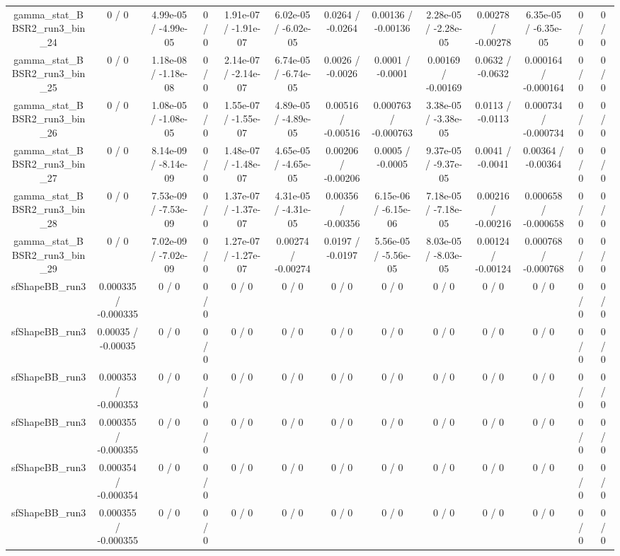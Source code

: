 \documentclass[10pt]{article}
\begin{document}
\begin{table}[htbp]
\begin{center}
\begin{tabular}{|c|c|c|c|c|c|c|c|c|c|c|c|c|}
  gamma_stat_BBSR2_run3_bin_24 & 0 / 0 & 4.99e-05 / -4.99e-05 & 0 / 0 & 1.91e-07 / -1.91e-07 & 6.02e-05 / -6.02e-05 & 0.0264 / -0.0264 & 0.00136 / -0.00136 & 2.28e-05 / -2.28e-05 & 0.00278 / -0.00278 & 6.35e-05 / -6.35e-05 & 0 / 0 & 0 / 0 \\ 
  gamma_stat_BBSR2_run3_bin_25 & 0 / 0 & 1.18e-08 / -1.18e-08 & 0 / 0 & 2.14e-07 / -2.14e-07 & 6.74e-05 / -6.74e-05 & 0.0026 / -0.0026 & 0.0001 / -0.0001 & 0.00169 / -0.00169 & 0.0632 / -0.0632 & 0.000164 / -0.000164 & 0 / 0 & 0 / 0 \\ 
  gamma_stat_BBSR2_run3_bin_26 & 0 / 0 & 1.08e-05 / -1.08e-05 & 0 / 0 & 1.55e-07 / -1.55e-07 & 4.89e-05 / -4.89e-05 & 0.00516 / -0.00516 & 0.000763 / -0.000763 & 3.38e-05 / -3.38e-05 & 0.0113 / -0.0113 & 0.000734 / -0.000734 & 0 / 0 & 0 / 0 \\ 
  gamma_stat_BBSR2_run3_bin_27 & 0 / 0 & 8.14e-09 / -8.14e-09 & 0 / 0 & 1.48e-07 / -1.48e-07 & 4.65e-05 / -4.65e-05 & 0.00206 / -0.00206 & 0.0005 / -0.0005 & 9.37e-05 / -9.37e-05 & 0.0041 / -0.0041 & 0.00364 / -0.00364 & 0 / 0 & 0 / 0 \\ 
  gamma_stat_BBSR2_run3_bin_28 & 0 / 0 & 7.53e-09 / -7.53e-09 & 0 / 0 & 1.37e-07 / -1.37e-07 & 4.31e-05 / -4.31e-05 & 0.00356 / -0.00356 & 6.15e-06 / -6.15e-06 & 7.18e-05 / -7.18e-05 & 0.00216 / -0.00216 & 0.000658 / -0.000658 & 0 / 0 & 0 / 0 \\ 
  gamma_stat_BBSR2_run3_bin_29 & 0 / 0 & 7.02e-09 / -7.02e-09 & 0 / 0 & 1.27e-07 / -1.27e-07 & 0.00274 / -0.00274 & 0.0197 / -0.0197 & 5.56e-05 / -5.56e-05 & 8.03e-05 / -8.03e-05 & 0.00124 / -0.00124 & 0.000768 / -0.000768 & 0 / 0 & 0 / 0 \\ 
  sfShapeBB_run3 & 0.000335 / -0.000335 & 0 / 0 & 0 / 0 & 0 / 0 & 0 / 0 & 0 / 0 & 0 / 0 & 0 / 0 & 0 / 0 & 0 / 0 & 0 / 0 & 0 / 0 \\ 
  sfShapeBB_run3 & 0.00035 / -0.00035 & 0 / 0 & 0 / 0 & 0 / 0 & 0 / 0 & 0 / 0 & 0 / 0 & 0 / 0 & 0 / 0 & 0 / 0 & 0 / 0 & 0 / 0 \\ 
  sfShapeBB_run3 & 0.000353 / -0.000353 & 0 / 0 & 0 / 0 & 0 / 0 & 0 / 0 & 0 / 0 & 0 / 0 & 0 / 0 & 0 / 0 & 0 / 0 & 0 / 0 & 0 / 0 \\ 
  sfShapeBB_run3 & 0.000355 / -0.000355 & 0 / 0 & 0 / 0 & 0 / 0 & 0 / 0 & 0 / 0 & 0 / 0 & 0 / 0 & 0 / 0 & 0 / 0 & 0 / 0 & 0 / 0 \\ 
  sfShapeBB_run3 & 0.000354 / -0.000354 & 0 / 0 & 0 / 0 & 0 / 0 & 0 / 0 & 0 / 0 & 0 / 0 & 0 / 0 & 0 / 0 & 0 / 0 & 0 / 0 & 0 / 0 \\ 
  sfShapeBB_run3 & 0.000355 / -0.000355 & 0 / 0 & 0 / 0 & 0 / 0 & 0 / 0 & 0 / 0 & 0 / 0 & 0 / 0 & 0 / 0 & 0 / 0 & 0 / 0 & 0 / 0 \\ 

\end{tabular}
\end{center}
\end{table}
\end{document}
